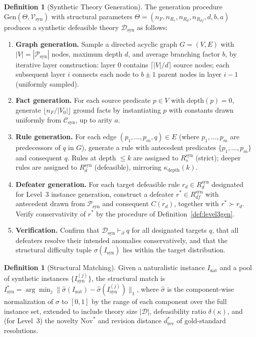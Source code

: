\documentclass{article}
\theoremstyle{definition}
\newtheorem{definition}[theorem]{Definition}
\newcommand{\D}{\mathcal{D}}
\newcommand{\Rs}{R_s}
\newcommand{\Rd}{R_d}
\newcommand{\Rdf}{R_{df}}
\newcommand{\partfunc}{\kappa}
\newcommand{\Nov}{\mathrm{Nov}}
\newcommand{\pPartial}{\vdash_{\partial}}
\newcommand{\comp}[1]{\overline{#1}}
\begin{document}
\begin{definition}[Synthetic Theory Generation]\label{def:synthgen}
The generation procedure $\mathrm{Gen}(\Theta, \mathcal{V}_{\mathrm{syn}})$ with structural parameters $\Theta = (n_F, n_{\Rs}, n_{\Rd}, n_{\Rdf}, d, b, a)$ produces a synthetic defeasible theory $\D_{\mathrm{syn}}$ as follows:
\begin{enumerate}[label=(\roman*),nosep]
    \item \textbf{Graph generation.} Sample a directed acyclic graph $G = (V, E)$ with $|V| = |\mathcal{P}_{\mathrm{syn}}|$ nodes, maximum depth $d$, and average branching factor $b$, by iterative layer construction: layer $0$ contains $\lceil |V|/d \rceil$ source nodes; each subsequent layer $i$ connects each node to $b \pm 1$ parent nodes in layer $i-1$ (uniformly sampled).
    \item \textbf{Fact generation.} For each source predicate $p \in V$ with $\mathrm{depth}(p) = 0$, generate $\lfloor n_F / |V_0| \rfloor$ ground facts by instantiating $p$ with constants drawn uniformly from $\mathcal{C}_{\mathrm{syn}}$, up to arity $a$.
    \item \textbf{Rule generation.} For each edge $(p_1, \ldots, p_m, q) \in E$ (where $p_1, \ldots, p_m$ are predecessors of $q$ in $G$), generate a rule with antecedent predicates $\{p_1, \ldots, p_m\}$ and consequent $q$. Rules at depth $\leq k$ are assigned to $\Rs^{\mathrm{syn}}$ (strict); deeper rules are assigned to $\Rd^{\mathrm{syn}}$ (defeasible), mirroring $\partfunc_{\mathrm{depth}}(k)$.
    \item \textbf{Defeater generation.} For each target defeasible rule $r_d \in \Rd^{\mathrm{syn}}$ designated for Level~3 instance generation, construct a defeater $r^* \in \Rdf^{\mathrm{syn}}$ with antecedent drawn from $\mathcal{P}_{\mathrm{syn}}$ and consequent $\comp{C(r_d)}$, together with $r^* \succ r_d$. Verify conservativity of $r^*$ by the procedure of Definition~\ref{def:level3gen}.
    \item \textbf{Verification.} Confirm that $\D_{\mathrm{syn}} \pPartial q$ for all designated targets $q$, that all defeaters resolve their intended anomalies conservatively, and that the structural difficulty tuple $\sigma(I_{\mathrm{syn}})$ lies within the target distribution.
\end{enumerate}
\end{definition}

\begin{definition}[Structural Matching]\label{def:structmatch}
Given a naturalistic instance $I_{\mathrm{nat}}$ and a pool of synthetic instances $\{I_{\mathrm{syn}}^{(j)}\}$, the structural match is $I_{\mathrm{syn}}^* = \arg\min_j \| \hat\sigma(I_{\mathrm{nat}}) - \hat\sigma(I_{\mathrm{syn}}^{(j)}) \|_1$, where $\hat\sigma$ is the component-wise normalization of $\sigma$ to $[0,1]$ by the range of each component over the full instance set, extended to include theory size $|\D|$, defeasibility ratio $\delta(\partfunc)$, and (for Level~3) the novelty $\Nov^*$ and revision distance $d_{\mathrm{rev}}^*$ of gold-standard resolutions.
\end{definition}
\end{document}
